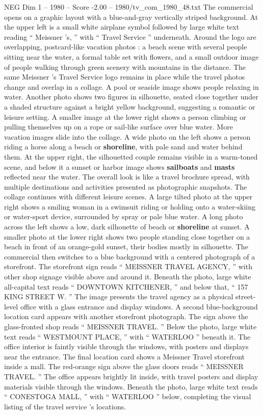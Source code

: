 \begin{textsample}{NEG Dim 1 – 1980 – Score -2.00 – 1980/tv\_com\_1980\_48.txt}  \label{ex:f1_neg_042}
The commercial opens on a graphic layout with a blue-and-gray vertically striped background.
At the upper left is a small white airplane symbol followed by large white text reading “ Meissner ’s, ” with “ Travel Service ” underneath.
Around the logo are overlapping, postcard-like vacation photos : a beach scene with several people sitting near the water, a formal table set with flowers, and a small outdoor image of people walking through green scenery with mountains in the distance.
The same Meissner ’s Travel Service logo remains in place while the travel photos change and overlap in a collage.
A pool or seaside image shows people relaxing in water.
Another photo shows two figures in silhouette, seated close together under a shaded structure against a bright yellow background, suggesting a romantic or leisure setting.
A smaller image at the lower right shows a person climbing or pulling themselves up on a rope or sail-like surface over blue water.
More vacation images slide into the collage.
A wide photo on the left shows a person riding a horse along a beach or \textbf{shoreline}, with pale sand and water behind them.
At the upper right, the silhouetted couple remains visible in a warm-toned scene, and below it a sunset or harbor image shows \textbf{sailboats} and \textbf{masts} reflected near the water.
The overall look is like a travel brochure spread, with multiple destinations and activities presented as photographic snapshots.
The collage continues with different leisure scenes.
A large tilted photo at the upper right shows a smiling woman in a swimsuit riding or holding onto a water-skiing or water-sport device, surrounded by spray or pale blue water.
A long photo across the left shows a low, dark silhouette of beach or \textbf{shoreline} at sunset.
A smaller photo at the lower right shows two people standing close together on a beach in front of an orange-gold sunset, their bodies mostly in silhouette.
The commercial then switches to a blue background with a centered photograph of a storefront.
The storefront sign reads “ MEISSNER TRAVEL AGENCY, ” with other shop signage visible above and around it.
Beneath the photo, large white all-capital text reads “ DOWNTOWN KITCHENER, ” and below that, “ 157 KING STREET W. ” The image presents the travel agency as a physical street-level office with a glass entrance and display windows.
A second blue-background location card appears with another storefront photograph.
The sign above the glass-fronted shop reads “ MEISSNER TRAVEL. ” Below the photo, large white text reads “ WESTMOUNT PLACE, ” with “ WATERLOO ” beneath it.
The office interior is faintly visible through the windows, with posters and displays near the entrance.
The final location card shows a Meissner Travel storefront inside a mall.
The red-orange sign above the glass doors reads “ MEISSNER TRAVEL. ” The office appears brightly lit inside, with travel posters and display materials visible through the windows.
Beneath the photo, large white text reads “ CONESTOGA MALL, ” with “ WATERLOO ” below, completing the visual listing of the travel service ’s locations.

\end{textsample}
